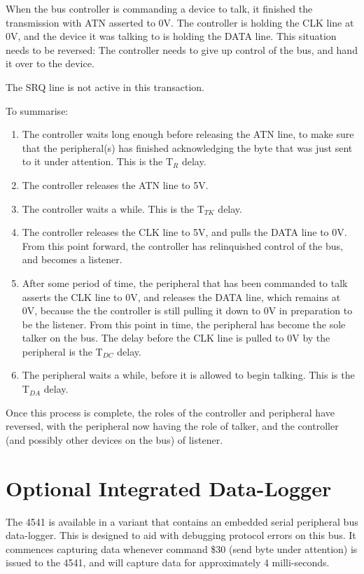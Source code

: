 When the bus controller is commanding a device to talk, it finished
the transmission with ATN asserted to 0V.  The controller is holding
the CLK line at 0V, and the device it was talking to is holding the
DATA line.  This situation needs to be reversed: The controller needs
to give up control of the bus, and hand it over to the device.

The SRQ line is not active in this transaction.

To summarise:

\begin{enumerate}
\item The controller waits long enough before releasing the
ATN line, to make sure that the peripheral(s) has finished acknowledging the
byte that was just sent to it under attention. This is the T$_{R}$ delay.
\item The controller releases the ATN line to 5V.
\item The controller waits a while. This is the T$_{TK}$ delay.
\item The controller releases the CLK line to 5V, and pulls the DATA
  line to 0V. From this point
  forward, the controller has relinquished control of the bus, and
  becomes a listener.
\item After some period of time, the peripheral that has been
  commanded to talk asserts the CLK line to 0V, and releases the DATA
  line, which remains at 0V, because the the controller is still
  pulling it down to 0V in preparation to be the listener.
  From this point
  in time, the peripheral has become the sole talker on the
  bus. The delay before the CLK line is pulled to 0V by the
  peripheral is the T$_{DC}$ delay.
\item The peripheral waits a while, before it is allowed to
  begin talking. This is the T$_{DA}$ delay.
\end{enumerate}

Once this process is complete, the roles of the controller and
peripheral have reversed, with the peripheral now having the role of
talker, and the controller (and possibly other devices on the bus) of
listener.



\section{Optional Integrated Data-Logger}

The 4541 is available in a variant that contains an embedded serial
peripheral bus data-logger. This is designed to aid with debugging
protocol errors on this bus. It commences capturing data whenever
command \$30 (send byte under attention) is issued to the 4541, and
will capture data for approximately 4 milli-seconds.

